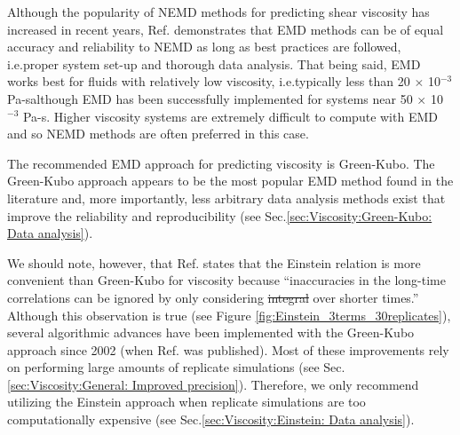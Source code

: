 \documentclass[9pt,bestpractices]{livecoms}
\providecommand{\DIFadd}[1]{{\protect\color{blue}\uwave{#1}}} %
\providecommand{\DIFdel}[1]{{\protect\color{red}\sout{#1}}}                      %
\providecommand{\DIFaddbegin}{} %
\providecommand{\DIFaddend}{} %
\providecommand{\DIFdelbegin}{} %
\providecommand{\DIFdelend}{} %
\begin{document}

Although the popularity of NEMD methods for predicting shear viscosity has increased in recent years, Ref. \cite{Chen2009} demonstrates that EMD methods can be of equal accuracy and reliability to NEMD as long as best practices are followed, i.e.\DIFaddbegin \DIFadd{, }\DIFaddend proper system set-up and thorough data analysis. That being said, EMD works best for fluids with relatively low viscosity, i.e.\DIFaddbegin \DIFadd{, }\DIFaddend typically less than 20 $\times$ 10$^{-3}$ Pa-s\DIFaddbegin \DIFadd{, }\DIFaddend although EMD has been successfully implemented for systems near 50 $\times$ 10$^{-3}$ Pa-s. Higher viscosity systems are extremely difficult to compute with EMD and so NEMD methods are often preferred in this case.

The recommended EMD approach for predicting viscosity is Green-Kubo. The Green-Kubo approach appears to be the most popular EMD method found in the literature and, more importantly, less arbitrary data analysis methods exist that improve the reliability and reproducibility (see Sec.\DIFaddbegin \DIFadd{\ }\DIFaddend \ref{sec:Viscosity:Green-Kubo: Data analysis}). 

We should note, however, that Ref. \cite{Hess2002} states that the Einstein relation is more convenient than Green-Kubo for viscosity because ``inaccuracies in the long-time correlations can be ignored by only considering \DIFdelbegin \DIFdel{integral }\DIFdelend \DIFaddbegin \DIFadd{integrals }\DIFaddend over shorter times.'' 
Although this observation is true (see Figure \ref{fig:Einstein_3terms_30replicates}), several algorithmic advances have been implemented with the Green-Kubo approach since 2002 (when Ref. \cite{Hess2002} was published). Most of these improvements rely on performing large amounts of replicate simulations (see Sec.\DIFaddbegin \DIFadd{\ }\DIFaddend \ref{sec:Viscosity:General: Improved precision}). Therefore, we only recommend utilizing the Einstein approach when replicate simulations are too computationally expensive (see Sec.\DIFaddbegin \DIFadd{\ }\DIFaddend \ref{sec:Viscosity:Einstein: Data analysis}).  
\end{document}
